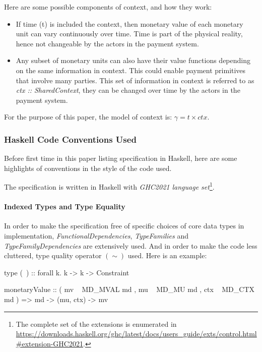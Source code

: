 Here are some possible components of context, and how they work:

\begin{itemize}
    \item If time (t) is included the context, then monetary value of each monetary unit can vary
continuously over time. Time is part of the physical reality, hence not changeable by the actors in
the payment system.

    \item Any subset of monetary units can also have their value functions depending on the same
information in context. This could enable payment primitives that involve many parties. This set of
information in context is referred to as \textit{ctx :: SharedContext}, they can be changed over
time by the actors in the payment system.
\end{itemize}

For the purpose of this paper, the model of context is: $\gamma = t \times ctx$.

\subsubsection{Haskell Code Conventions Used}

Before first time in this paper listing specification in Haskell, here are some highlights of
conventions in the style of the code used.

The specification is written in Haskell with \textit{GHC2021 language set}\footnote{The complete set
of the extensions is enumerated in
\url{https://downloads.haskell.org/ghc/latest/docs/users_guide/exts/control.html\#extension-GHC2021}.}.

\paragraph{Indexed Types and Type Equality}

In order to make the specification free of specific choices of core data types in
implementation, \textit{FunctionalDependencies}, \textit{TypeFamilies}
and \textit{TypeFamilyDependencies} are extensively used. And in order to make the code less
cluttered, type quality operator $(\sim)$
used. Here is an example:

\begin{code}
    type (~) :: forall k. k -> k -> Constraint

    monetaryValue :: ( mv  ~ MD_MVAL md
                     , mu  ~ MD_MU md
                     , ctx ~ MD_CTX md
                     )
                  => md -> (mu, ctx) -> mv
\end{code}

